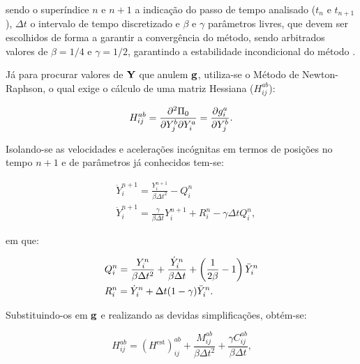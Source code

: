 \noindent sendo o superíndice $n$ e $n+1$ a indicação do passo de tempo analisado ($t_n$ e $t_{n+1}$), $\Delta t$ o intervalo de tempo discretizado e $\beta$ e $\gamma$ parâmetros livres, que devem ser escolhidos de forma a garantir a convergência do método, sendo arbitrados valores de $\beta=1/4$ e $\gamma=1/2$, garantindo a estabilidade incondicional do método \cite{LINDFIELD2019239}.

Já para procurar valores de $\mathbf{Y}$ que anulem $\mathbf{g}$, utiliza-se o Método de Newton-Raphson, o qual exige o cálculo de uma matriz Hessiana ($H_{ij}^{ab}$):

\begin{equation}
    H_{ij}^{ab}=\frac{\partial^2\Pi_0}{\partial Y_j^b\partial Y_i^a}=\frac{\partial{g_i^a}}{\partial{Y_j^b}}\text{.}
\end{equation}

Isolando-se as velocidades e acelerações incógnitas em termos de posições no tempo $n+1$ e de parâmetros já conhecidos tem-se:

\begin{subequations}
    \begin{align}
         & \ddot{Y}_i^{n+1}=\frac{Y_i^{n+1}}{\beta\Delta t^2}-Q_i^n                                \\
         & \dot{Y}_i^{n+1}=\frac{\gamma}{\beta\Delta t}Y_i^{n+1}+R_i^n-\gamma\Delta tQ_i^n\text{,}
    \end{align}
    \label{eq:CSD-Newmark2}
\end{subequations}

\noindent em que:

\begin{subequations}
    \begin{align}
         & Q_i^n=\frac{Y_i^n}{\beta\Delta t^2}+\frac{\dot{Y}_i^n}{\beta\Delta t}+\left({\frac{1}{2\beta}-1}\right)\ddot{Y}_i^n \\
         & R_i^n=\dot{Y}_i^n+\Delta t(1-\gamma)\ddot{Y}_i^n\text{.}
    \end{align}
    \label{eq:CSD-QnRn}
\end{subequations}

Substituindo-os em $\mathbf{g}$ e realizando as devidas simplificações, obtém-se:

\begin{equation}
    H_{ij}^{ab}=(H^\text{est})_{ij}^{ab}+\frac{M_{ij}^{ab}}{\beta\Delta t^2}+\frac{\gamma C_{ij}^{ab}}{\beta\Delta t}\text{,}
    \label{eq:CSD-Hijab}
\end{equation}

